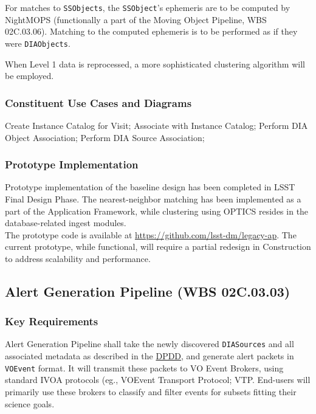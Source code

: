 \documentclass[12pt]{article}
\newcommand{\code}[1]{\texttt{#1}}
\newcommand{\DIASources}{\code{DIASources}\xspace}
\newcommand{\DIAObjects}{\code{DIAObjects}\xspace}
\newcommand{\SSObject}{\code{SSObject}\xspace}
\newcommand{\SSObjects}{\code{SSObjects}\xspace}
\newcommand{\VOEvent}{\code{VOEvent}\xspace}
\newcommand{\ds}[2]{{\color{blue} \href{https://docushare.lsstcorp.org/docushare/dsweb/Get/#1}{#2}}\xspace}
\newcommand{\DPDD}{\ds{LSE-163}{DPDD}}
\newcommand{\wbsAP}{WBS 02C.03.03}
\newcommand{\wbsMOPS}{WBS 02C.03.06}
\begin{document}
For matches to \SSObjects, the \SSObject's ephemeris are to be computed by NightMOPS (functionally a part of the Moving Object Pipeline, \wbsMOPS). Matching to the computed ephemeris is to be performed as if they were \DIAObjects.

When Level 1 data is reprocessed, a more sophisticated clustering algorithm \cite{Ankerst99} will be employed.

\subsubsection{Constituent Use Cases and Diagrams}

Create Instance Catalog for Visit; Associate with Instance Catalog;
Perform DIA Object Association; Perform DIA Source Association;

\subsubsection{Prototype Implementation}

Prototype implementation of the baseline design has been completed in LSST Final Design Phase. The nearest-neighbor matching has been implemented as a part of the Application Framework, while clustering using OPTICS resides in the database-related ingest modules.
\\

The prototype code is available at \url{https://github.com/lsst-dm/legacy-ap}. The current prototype, while functional, will require a partial redesign in Construction to address scalability and performance.

\clearpage

\subsection{Alert Generation Pipeline (\wbsAP)}

\subsubsection{Key Requirements}

Alert Generation Pipeline shall take the newly discovered \DIASources and all associated metadata as described in the \DPDD, and generate alert packets in \VOEvent format. It will transmit these packets to VO Event Brokers, using standard IVOA protocols (eg., VOEvent Transport Protocol; VTP\@. End-users will primarily use these brokers to classify and filter events for subsets fitting their science goals.
\end{document}
